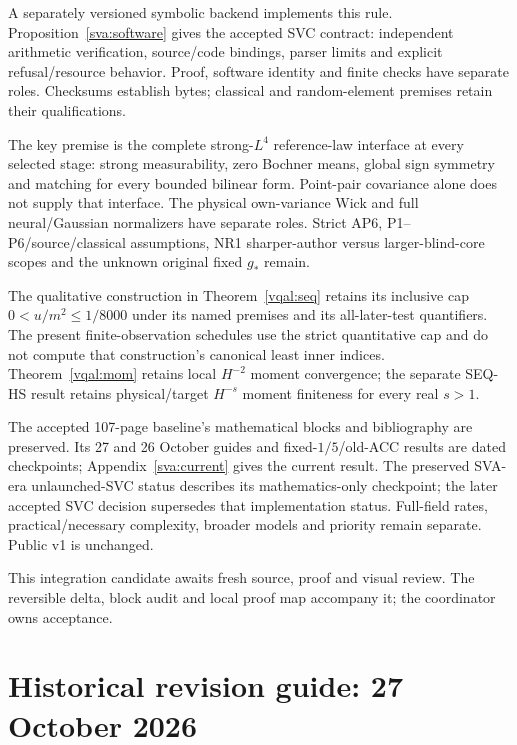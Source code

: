 \documentclass[11pt]{article}
\theoremstyle{plain}
\theoremstyle{definition}
\theoremstyle{remark}
\begin{document}
A separately versioned symbolic backend implements this rule.
Proposition~\ref{sva:software} gives the accepted SVC contract: independent
arithmetic verification, source/code bindings, parser limits and explicit
refusal/resource behavior. Proof, software identity and finite checks
have separate roles. Checksums establish bytes;
classical and random-element premises retain their qualifications.

The key premise is the complete strong-$L^4$ reference-law interface at
every selected stage: strong measurability, zero Bochner means, global
sign symmetry and matching for every bounded bilinear form. Point-pair
covariance alone does not supply that interface. The physical own-variance
Wick and full neural/Gaussian normalizers have separate roles. Strict
AP6, P1--P6/source/classical assumptions, NR1 sharper-author versus
larger-blind-core scopes and the unknown original fixed $g_*$ remain.

The qualitative construction in Theorem~\ref{vqal:seq} retains its
inclusive cap $0<u/m^2\le1/8000$ under its named premises and its
all-later-test quantifiers. The present finite-observation schedules use
the strict quantitative cap and do not compute that construction's
canonical least inner indices. Theorem~\ref{vqal:mom} retains local
$H^{-2}$ moment convergence; the separate SEQ-HS result retains
physical/target $H^{-s}$ moment finiteness for every real $s>1$.

The accepted 107-page baseline's mathematical blocks and bibliography are
preserved. Its 27 and 26 October guides and fixed-$1/5$/old-ACC results
are dated checkpoints; Appendix~\ref{sva:current} gives the current result.
The preserved SVA-era unlaunched-SVC status describes its mathematics-only
checkpoint; the later accepted SVC decision supersedes that implementation
status. Full-field rates, practical/necessary complexity, broader models
and priority remain separate. Public v1 is unchanged.

This integration candidate awaits fresh source, proof and visual review.
The reversible delta, block audit and local proof map accompany it;
the coordinator owns acceptance.

\clearpage
\section*{Historical revision guide: 27 October 2026}
\label{vqal:guide}
\end{document}
